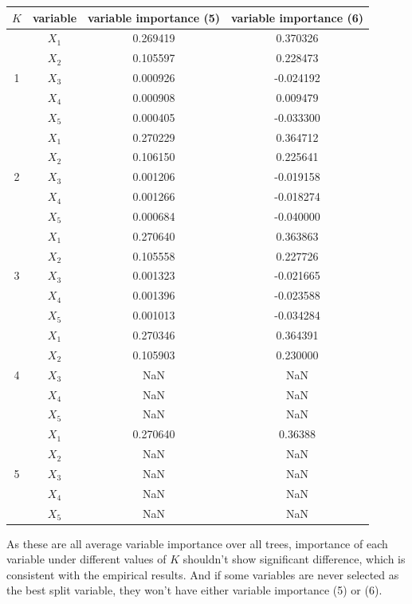 \documentclass[paper=letter, fontsize=12pt]{article}
\begin{document}
\begin{enumerate}[label=(\alph*)]
\begin{enumerate}[label=(\roman*)]
		\begin{longtable}{|c|c|c|c|}
			\hline
			$K$ & variable & variable importance (5) & variable importance (6) \\ \hline
			\multirow{5}{1em}{1} & $X_1$ & 0.269419 & 0.370326 \\ 
			& $X_2$ & 0.105597 & 0.228473 \\
			& $X_3$ & 0.000926 & -0.024192 \\
			& $X_4$ & 0.000908 & 0.009479 \\
			& $X_5$ & 0.000405 & -0.033300 \\
			\hline
			\multirow{5}{1em}{2} & $X_1$ & 0.270229 & 0.364712 \\ 
			& $X_2$ & 0.106150 & 0.225641 \\
			& $X_3$ & 0.001206 & -0.019158 \\
			& $X_4$ & 0.001266 & -0.018274 \\
			& $X_5$ & 0.000684 & -0.040000 \\
			\hline
			\multirow{5}{1em}{3} & $X_1$ & 0.270640 & 0.363863 \\ 
			& $X_2$ & 0.105558 & 0.227726 \\
			& $X_3$ & 0.001323 & -0.021665 \\
			& $X_4$ & 0.001396 & -0.023588 \\
			& $X_5$ & 0.001013 & -0.034284 \\
			\hline
			\multirow{5}{1em}{4} & $X_1$ & 0.270346 & 0.364391 \\ 
			& $X_2$ & 0.105903 & 0.230000 \\
			& $X_3$ & NaN & NaN \\
			& $X_4$ & NaN & NaN \\
			& $X_5$ & NaN & NaN \\
			\hline
			\multirow{5}{1em}{5} & $X_1$ & 0.270640 & 0.36388 \\ 
			& $X_2$ & NaN & NaN \\
			& $X_3$ & NaN & NaN \\
			& $X_4$ & NaN & NaN \\
			& $X_5$ & NaN & NaN \\
			\hline
		\end{longtable}
	
		As these are all average variable importance over all trees, importance of each variable under different values of $K$ shouldn't show significant difference, which is consistent with the empirical results. And if some variables are never selected as the best split variable, they won't have either variable importance (5) or (6).
		

\end{enumerate}
\end{enumerate}
\end{document}
